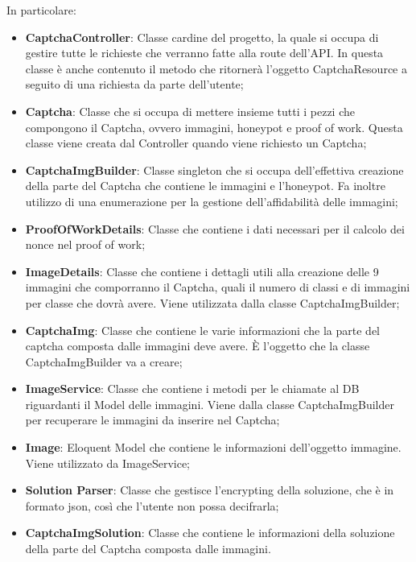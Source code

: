 In particolare:
\begin{itemize}
    \item \textbf{CaptchaController}: Classe cardine del progetto, la quale si occupa di gestire tutte le richieste che verranno fatte alla route dell'API. In questa classe è anche contenuto il metodo che ritornerà l'oggetto CaptchaResource a seguito di una richiesta da parte dell'utente;
    \item \textbf{Captcha}: Classe che si occupa di mettere insieme tutti i pezzi che compongono il Captcha, ovvero immagini, honeypot e proof of work. Questa classe viene creata dal Controller quando viene richiesto un Captcha;
    \item \textbf{CaptchaImgBuilder}: Classe singleton che si occupa dell'effettiva creazione della parte del Captcha che contiene le immagini e l'honeypot. Fa inoltre utilizzo di una enumerazione per la gestione dell'affidabilità delle immagini;
    \item \textbf{ProofOfWorkDetails}: Classe che contiene i dati necessari per il calcolo dei nonce nel proof of work;
    \item \textbf{ImageDetails}: Classe che contiene i dettagli utili alla creazione delle 9 immagini che comporranno il Captcha, quali il numero di classi e di immagini per classe che dovrà avere. Viene utilizzata dalla classe CaptchaImgBuilder;
    \item \textbf{CaptchaImg}: Classe che contiene le varie informazioni che la parte del captcha composta dalle immagini deve avere. È l'oggetto che la classe CaptchaImgBuilder va a creare;
    \item \textbf{ImageService}: Classe che contiene i metodi per le chiamate al DB riguardanti il Model delle immagini. Viene dalla classe CaptchaImgBuilder per recuperare le immagini da inserire nel Captcha;
    \item \textbf{Image}: Eloquent Model che contiene le informazioni dell'oggetto immagine. Viene utilizzato da ImageService;
    \item \textbf{Solution Parser}: Classe che gestisce l'encrypting della soluzione, che è in formato json, così che l'utente non possa decifrarla;
    \item \textbf{CaptchaImgSolution}: Classe che contiene le informazioni della soluzione della parte del Captcha composta dalle immagini.
\end{itemize}

